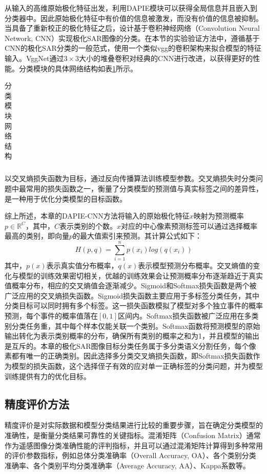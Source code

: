 从输入的高维原始极化特征出发，利用DAPIE模块可以获得全局信息并且嵌入到分类器中。因此原始极化特征中有价值的信息被激发，而没有价值的信息被抑制。当具备了重新校正的极化特征之后，设计基于卷积神经网络（Convolution Neural Network, CNN）实现极化SAR图像的分类。在本节的实验验证方法中，遵循基于CNN的极化SAR分类的一般范式，使用一个类似vgg的卷积架构来拟合模型的特征输入。VggNet通过$3 \times 3$大小的堆叠卷积对经典的CNN进行改进，以获得更好的性能。分类模块的具体网络结构如表\ref{CNN-Vgg}所示。
\begin{table}[ht]
    \caption{分类模块网络结构}
    \begin{tabular}{ccc}
    \end{tabular}
    \label{CNN-Vgg}
\end{table}

以交叉熵损失函数\citing{}为目标，通过反向传播算法训练模型参数。交叉熵损失时分类问题中最常用的损失函数之一，衡量了分类模型的预测值与真实标签之间的差异性，是一种用于优化分类模型的目标函数。

综上所述，本章的DAPIE-CNN方法将输入的原始极化特征$x$映射为预测概率$p\in \mathbb{R}^{C}$，其中，$C$表示类别的个数。$x$对应的中心像素预测标签可以通过选择概率最高的类别，即向量$p$的最大值索引来预测。其计算公式如下：
\begin{equation}
    H(p,q)=\sum_{i=1}^{n}p(x_i)log(q(x_i))
\end{equation}
其中，$p(x)$表示真实值分布概率，$q(x)$表示模型预测分布概率。交叉熵值的变化与模型的训练效果密切相关，优越的训练效果会让预测概率分布逐渐趋近于真实值概率分布，相应的交叉熵值会逐渐减少。Sigmoid和Softmax损失函数是两个被广泛应用的交叉熵损失函数。Sigmoid损失函数主要应用于多标签分类任务，其中分类目标可以同时拥有多个标签。这一损失函数模拟了模型对多个独立事件的概率预测，每个事件的概率值落在$[0,1]$区间内。Softmax损失函数被广泛应用在多类别分类任务重，其中每个样本仅能关联一个类别。Softmax函数将预测模型的原始输出转化为表示类别概率的分布，确保所有类别的概率之和为1，并且模型的输出是互斥的。本章的极化SAR图像目标分类任务属于多分类语义分割任务，每个像素都有唯一的正确类别。因此选择多分类交叉熵损失函数，即Softmax损失函数作为模型的损失函数，这个选择侄子有效的应对单一正确标签的分类问题，并为模型训练提供有力的优化目标。


\subsection{精度评价方法}
精度评价是对实际数据和模型分类结果进行比较的重要步骤，旨在确定分类模型的准确性，是衡量分类结果可靠性的关键指标。混淆矩阵（Confusion Matrix）通常作为遥感图像分类准确性能的评判指标，并且可以通过混淆矩阵计算得到多种常用的评价参数指标，例如总体分类准确率（Overall Accuracy, OA）、各个类别分类准确率、各个类别平均分类准确率（Average Accuracy, AA）、Kappa系数等。

